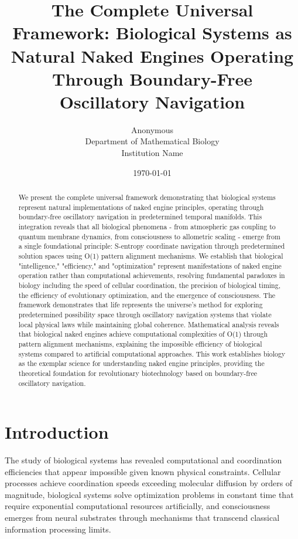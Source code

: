 \documentclass[12pt,a4paper]{article}
\title{The Complete Universal Framework: Biological Systems as Natural Naked Engines Operating Through Boundary-Free Oscillatory Navigation}
\author{
Anonymous\\
Department of Mathematical Biology\\
Institution Name
}
\date{\today}
\begin{document}
\maketitle

\begin{abstract}
We present the complete universal framework demonstrating that biological systems represent natural implementations of naked engine principles, operating through boundary-free oscillatory navigation in predetermined temporal manifolds. This integration reveals that all biological phenomena - from atmospheric gas coupling to quantum membrane dynamics, from consciousness to allometric scaling - emerge from a single foundational principle: S-entropy coordinate navigation through predetermined solution spaces using O(1) pattern alignment mechanisms. We establish that biological "intelligence," "efficiency," and "optimization" represent manifestations of naked engine operation rather than computational achievements, resolving fundamental paradoxes in biology including the speed of cellular coordination, the precision of biological timing, the efficiency of evolutionary optimization, and the emergence of consciousness. The framework demonstrates that life represents the universe's method for exploring predetermined possibility space through oscillatory navigation systems that violate local physical laws while maintaining global coherence. Mathematical analysis reveals that biological naked engines achieve computational complexities of O(1) through pattern alignment mechanisms, explaining the impossible efficiency of biological systems compared to artificial computational approaches. This work establishes biology as the exemplar science for understanding naked engine principles, providing the theoretical foundation for revolutionary biotechnology based on boundary-free oscillatory navigation.
\end{abstract}

\section{Introduction}

The study of biological systems has revealed computational and coordination efficiencies that appear impossible given known physical constraints. Cellular processes achieve coordination speeds exceeding molecular diffusion by orders of magnitude, biological systems solve optimization problems in constant time that require exponential computational resources artificially, and consciousness emerges from neural substrates through mechanisms that transcend classical information processing limits.
\end{document}
